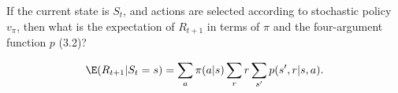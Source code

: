 
\begin{exercise}

If the current state is $S_t$, and actions are selected according to stochastic
policy $v_\pi$, then what is the expectation of $R_{t+1}$ in terms of $\pi$ and
the four-argument function $p$ (3.2)?

\end{exercise}


\begin{solution}

\begin{align*}
  \E(R_{t+1}|S_t = s) = \sum_a \pi(a|s) \sum_r r \sum_{s'} p(s',r|s,a).
\end{align*}

\end{solution}

